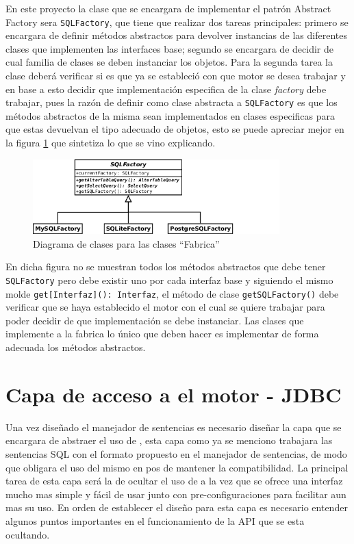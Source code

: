 En este proyecto la clase que se encargara de implementar el patrón Abstract Factory sera \verb=SQLFactory=, que tiene que realizar dos tareas principales: primero se encargara de definir métodos abstractos para devolver instancias de las diferentes clases que implementen las interfaces base; segundo se encargara de decidir de cual familia de clases se deben instanciar los objetos. Para la segunda tarea la clase deberá verificar si es que ya se estableció con que motor se desea trabajar y en base a esto decidir que implementación especifica de la clase \textit{factory} debe trabajar, pues la razón de definir como clase abstracta a \verb=SQLFactory= es que los métodos abstractos de la misma sean implementados en clases especificas para que estas devuelvan el tipo adecuado de objetos, esto se puede apreciar mejor en la figura \ref{fig:crossdb-factory} que sintetiza lo que se vino explicando. 
%
\begin{figure}[h]
  \centering
    \includegraphics[width=0.85\textwidth]{figuras/crossdb-factory.png}
  \caption{Diagrama de clases para las clases ``Fabrica''}
  \label{fig:crossdb-factory}
\end{figure}

En dicha figura no se muestran todos los métodos abstractos que debe tener \verb=SQLFactory= pero debe existir uno por cada interfaz base y siguiendo el mismo molde \verb=get[Interfaz](): Interfaz=, el método de clase \verb=getSQLFactory()= debe verificar que se haya establecido el motor con el cual se quiere trabajar para poder decidir de que implementación se debe instanciar. Las clases que implemente a la fabrica lo único que deben hacer es implementar de forma adecuada los métodos abstractos.  
%
\section{Capa de acceso a el motor - JDBC}
Una vez diseñado el manejador de sentencias es necesario diseñar la capa que se encargara de abstraer el uso de \jd, esta capa como ya se menciono trabajara las sentencias SQL con el formato propuesto en el manejador de sentencias, de modo que obligara el uso del mismo en pos de mantener la compatibilidad. La principal tarea de esta capa será la de ocultar el uso de \jd  a la vez que se ofrece una interfaz mucho mas simple y fácil de usar junto con pre-configuraciones para facilitar aun mas su uso. En orden de establecer el diseño para esta capa es necesario entender algunos puntos importantes en el funcionamiento de la API que se esta ocultando.
%
